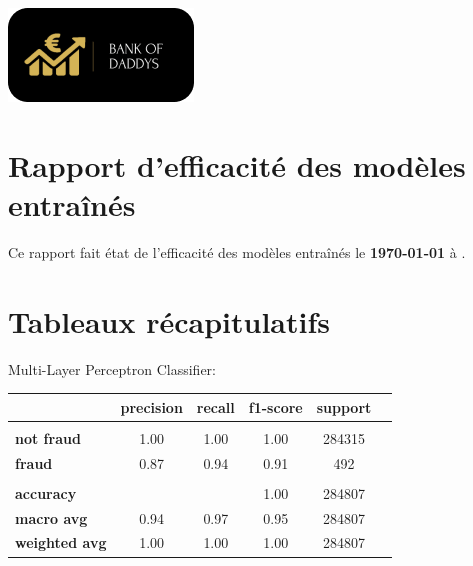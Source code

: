 \documentclass[10pt,a4paper]{article}
\begin{document}
\begin{center}
\includegraphics[scale=1]{../views/img/background_splash} 
\end{center}
\section{Rapport d'efficacité des modèles entraînés }
\flushleft
\bigbreak  
\bigbreak  
Ce rapport fait état de l'efficacité des modèles entraînés le \textbf {\today{}}  à  \textbf {\DTMcurrenttime{}}.
\bigbreak  
\section{Tableaux récapitulatifs}
\flushleft
\bigbreak  
\bigbreak  
\large  {Multi-Layer Perceptron Classifier:}
\bigbreak
\normalsize
\begin{center}
\begin{tabular}{ l | c  c  c  c  c  }
 & \textbf{precision} & \textbf {recall} & \textbf {f1-score} & \textbf {support}\\
\hline
& & & &\\
\textbf {not fraud} & 1.00 & 1.00 & 1.00 & 284315 \\
\textbf {fraud} & 0.87 & 0.94 & 0.91 & 492\\
& & & &\\
\textbf {accuracy} &  & & 1.00 & 284807\\
\textbf {macro avg} & 0.94 & 0.97 & 0.95 & 284807\\
\textbf {weighted avg} & 1.00 & 1.00 & 1.00 & 284807\\
\end{tabular}
\end{center}
\end{document}
